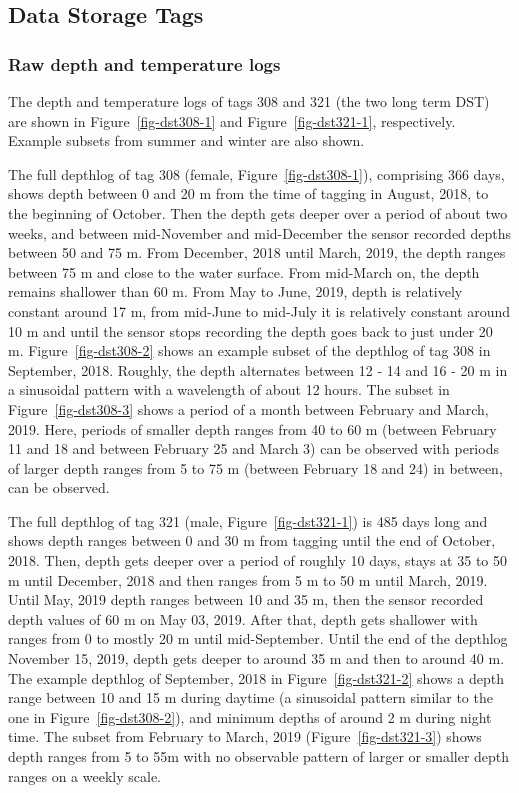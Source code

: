 \documentclass[
  authoryear,
  review,
  3p]{elsarticle}
\begin{document}
\hypertarget{sec-results-dst}{%
\subsection{Data Storage Tags}\label{sec-results-dst}}

\hypertarget{raw-depth-and-temperature-logs}{%
\subsubsection{Raw depth and temperature
logs}\label{raw-depth-and-temperature-logs}}

The depth and temperature logs of tags 308 and 321 (the two long term
DST) are shown in Figure~\ref{fig-dst308-1} and
Figure~\ref{fig-dst321-1}, respectively. Example subsets from summer and
winter are also shown.

The full depthlog of tag 308 (female, Figure~\ref{fig-dst308-1}),
comprising 366 days, shows depth between 0 and 20 m from the time of
tagging in August, 2018, to the beginning of October. Then the depth
gets deeper over a period of about two weeks, and between mid-November
and mid-December the sensor recorded depths between 50 and 75 m. From
December, 2018 until March, 2019, the depth ranges between 75 m and
close to the water surface. From mid-March on, the depth remains
shallower than 60 m. From May to June, 2019, depth is relatively
constant around 17 m, from mid-June to mid-July it is relatively
constant around 10 m and until the sensor stops recording the depth goes
back to just under 20 m. Figure~\ref{fig-dst308-2} shows an example
subset of the depthlog of tag 308 in September, 2018. Roughly, the depth
alternates between 12 - 14 and 16 - 20 m in a sinusoidal pattern with a
wavelength of about 12 hours. The subset in Figure~\ref{fig-dst308-3}
shows a period of a month between February and March, 2019. Here,
periods of smaller depth ranges from 40 to 60 m (between February 11 and
18 and between February 25 and March 3) can be observed with periods of
larger depth ranges from 5 to 75 m (between February 18 and 24) in
between, can be observed.

The full depthlog of tag 321 (male, Figure~\ref{fig-dst321-1}) is 485
days long and shows depth ranges between 0 and 30 m from tagging until
the end of October, 2018. Then, depth gets deeper over a period of
roughly 10 days, stays at 35 to 50 m until December, 2018 and then
ranges from 5 m to 50 m until March, 2019. Until May, 2019 depth ranges
between 10 and 35 m, then the sensor recorded depth values of 60 m on
May 03, 2019. After that, depth gets shallower with ranges from 0 to
mostly 20 m until mid-September. Until the end of the depthlog November
15, 2019, depth gets deeper to around 35 m and then to around 40 m. The
example depthlog of September, 2018 in Figure~\ref{fig-dst321-2} shows a
depth range between 10 and 15 m during daytime (a sinusoidal pattern
similar to the one in Figure~\ref{fig-dst308-2}), and minimum depths of
around 2 m during night time. The subset from February to March, 2019
(Figure~\ref{fig-dst321-3}) shows depth ranges from 5 to 55m with no
observable pattern of larger or smaller depth ranges on a weekly scale.
\end{document}

